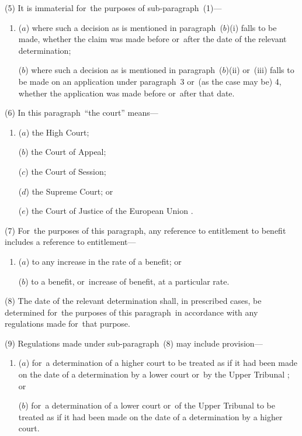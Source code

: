 \documentclass[12pt,a4paper]{article}
\begin{document}
(5) It is immaterial for~the purposes of sub-paragraph~(1)—
\begin{enumerate}\item[]
($a$) where such a decision as is mentioned in paragraph~($b$)(i)  falls to be made, whether the claim was made before or~after the date of the relevant determination;

($b$) where such a decision as is mentioned in paragraph~($b$)(ii)  or~(iii)  falls to be made on an application under paragraph~3 or~(as the case may be) 4, whether the application was made before or~after that date.
\end{enumerate}

(6) In this paragraph~“the court” means—
\begin{enumerate}\item[]
($a$) the High Court;

($b$) the Court of Appeal;

($c$) the Court of Session;


($d$) the Supreme Court; or

($e$) the Court of Justice of the 
European Union%
.
\end{enumerate}

(7) For~the purposes of this paragraph, any reference to entitlement to benefit includes a reference to entitlement—
\begin{enumerate}\item[]
($a$) to any increase in the rate of a benefit; or

($b$) to a benefit, or~increase of benefit, at a particular rate.
\end{enumerate}

(8) The date of the relevant determination shall, in prescribed cases, be determined for~the purposes of this paragraph~in accordance with any regulations made for~that purpose.

(9) Regulations made under sub-paragraph~(8)  may include provision—
\begin{enumerate}\item[]
($a$) for~a determination of a higher court to be treated as if it had been made on the date of a determination by a lower court or~by 
the Upper Tribunal%
; or

($b$) for~a determination of a lower court or~of 
the Upper Tribunal  %
to be treated as if it had been made on the date of a determination by a higher court.
\end{enumerate}
\end{document}

